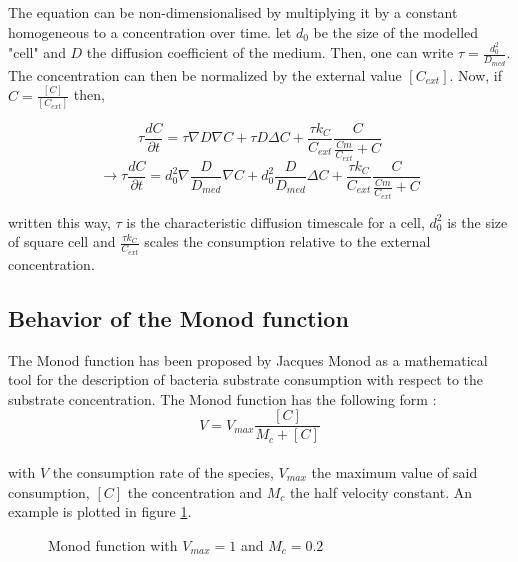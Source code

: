 \documentclass[11pt,a4paper]{article}
\begin{document}
The equation can be non-dimensionalised by multiplying it by a constant homogeneous to a concentration over time. let $d_0$ be the size of the modelled "cell"  and $D$ the diffusion coefficient of the medium. Then, one can write $\tau  = \frac{d_0^2}{D_{med}}$. The concentration can then be normalized by the external value $[C_{ext}]$. Now, if $C = \frac{[C]}{[C_{ext}]}$ then, 

\[ \tau \frac{d C}{\partial t}  = \tau \nabla D \nabla C + \tau  D  \Delta C + \frac{\tau k_C}{C_{ext}} \frac{C}{\frac{Cm}{C_{ext}} + C}  \]
\[ \rightarrow \tau \frac{d C}{\partial t}  = d_0^2 \nabla \frac{D}{D_{med}} \nabla C + d_0^2 \frac{D}{D_{med}} \Delta C + \frac{\tau k_C}{C_{ext}} \frac{C}{\frac{Cm}{C_{ext}} + C}  \]

written this way, $\tau$ is the characteristic diffusion timescale for a cell, $d_0^2$ is the size of square cell and $\frac{\tau k_C}{C_{ext}}$ scales the consumption relative to the external concentration.\\


\subsection{Behavior of the Monod function}
The Monod function has been proposed by Jacques Monod as a mathematical tool for the description of bacteria substrate consumption with respect to the substrate concentration. The Monod function has the following form : \\

\[V = V_{max} \frac{[C]}{M_c + [C]}\]\\

with $V$ the consumption rate of the species, $V_{max}$ the maximum value of said consumption, $[C]$ the concentration and $M_c$ the half velocity constant. An  example is plotted in figure \ref{monod}.\\

\usetikzlibrary {datavisualization.formats.functions}
\begin{figure}[ht!]
\begin{center}
\end{center}
\caption{Monod function with $V_{max} =1 $ and $M_c = 0.2$  \label{monod}}
\end{figure}
\end{document}
